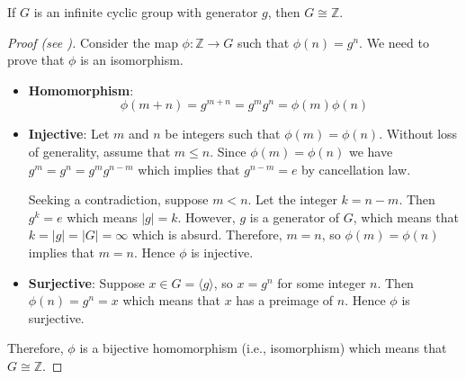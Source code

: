 \begin{theorem}
    If $G$ is an infinite cyclic group with generator $g$, then $G \cong \mathbb{Z}$.
\end{theorem}
\begin{proof}[Proof (see \cite{proofwiki_infinitecyclicgrp})]
    Consider the map $\phi: \mathbb{Z} \to G$ such that $\phi(n) = g^n$. We need to prove that $\phi$ is an isomorphism.
    \begin{itemize}
        \item \textbf{Homomorphism}:
        \[
            \phi(m+n) = g^{m+n} = g^mg^n = \phi(m)\phi(n)
        \]

        \item \textbf{Injective}: Let $m$ and $n$ be integers such that $\phi(m) = \phi(n)$. Without loss of generality, assume that $m \leq n$. Since $\phi(m) = \phi(n)$ we have $g^m = g^n = g^mg^{n-m}$ which implies that $g^{n-m} = e$ by cancellation law.

        Seeking a contradiction, suppose $m < n$. Let the integer $k = n - m$. Then $g^k = e$ which means $|g| = k$. However, $g$ is a generator of $G$, which means that $k = |g| = |G| = \infty$ which is absurd. Therefore, $m = n$, so $\phi(m) = \phi(n)$ implies that $m = n$. Hence $\phi$ is injective.

        \item \textbf{Surjective}: Suppose $x \in G = \langle g\rangle$, so $x = g^n$ for some integer $n$. Then $\phi(n) = g^n = x$ which means that $x$ has a preimage of $n$. Hence $\phi$ is surjective.
    \end{itemize}

    Therefore, $\phi$ is a bijective homomorphism (i.e., isomorphism) which means that $G \cong \mathbb{Z}$.
\end{proof}

